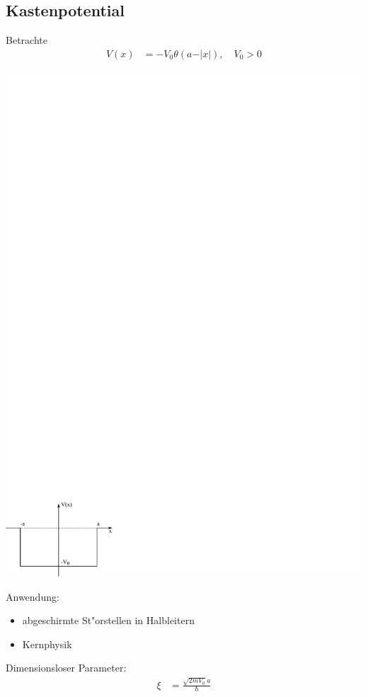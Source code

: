 \documentclass[a4paper]{scrartcl}
\begin{document}
{\subsection{Kastenpotential}
Betrachte
\begin{align}
V(x) & = - V_0 \theta(a - \vert x \vert), \quad V_0 > 0
\end{align}
\begin{center}
\includegraphics{203Katenpot}
\end{center}
Anwendung:
\begin{itemize}
\item abgeschirmte St"orstellen in Halbleitern
\item Kernphysik
\end{itemize}
Dimensionsloser Parameter:
\begin{align}
\xi & = \frac{\sqrt{2 m V_0} a}{\hbar}
\end{align}
}
\end{document}
